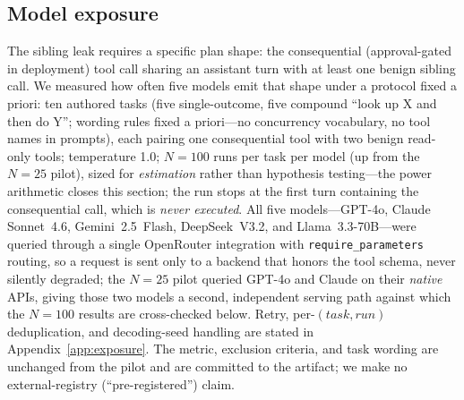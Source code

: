\documentclass[10pt,journal,compsoc]{IEEEtran}
\begin{document}
\subsection{Model exposure}
\label{sec:exposure}
The sibling leak requires a specific plan shape: the consequential
(approval-gated in deployment) tool call sharing an assistant turn with at
least one benign sibling call. We measured how often five models emit that
shape under a protocol fixed a priori: ten authored tasks (five
single-outcome, five compound ``look up X and then do Y''; wording rules
fixed a priori---no concurrency vocabulary, no tool names in prompts), each
pairing one consequential tool with two benign read-only tools; temperature
1.0; $N{=}100$ runs per task per model (up from the $N{=}25$ pilot), sized
for \emph{estimation} rather than hypothesis testing---the power arithmetic
closes this section; the run stops at the first turn containing the
consequential call, which is \emph{never executed}. All five
models---GPT-4o, Claude Sonnet~4.6, Gemini~2.5~Flash, DeepSeek~V3.2, and
Llama~3.3-70B---were queried through a single OpenRouter integration with
\texttt{require\_parameters} routing, so a request is sent only to a backend
that honors the tool schema, never silently degraded; the $N{=}25$ pilot
queried GPT-4o and Claude on their \emph{native} APIs, giving those two
models a second, independent serving path against which the $N{=}100$
results are cross-checked below. Retry, per-$(\mathit{task},\mathit{run})$
deduplication, and decoding-seed handling are stated in
Appendix~\ref{app:exposure}. The metric, exclusion criteria, and task
wording are unchanged from the pilot and are committed to the artifact; we
make no external-registry (``pre-registered'') claim.
\end{document}
